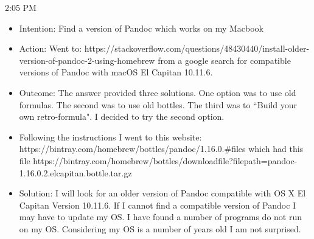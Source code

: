\documentclass{article}
\begin{document}
2:05 PM

\begin{itemize}
    \item Intention: Find a version of Pandoc which works on my Macbook
    \item Action: Went to: https://stackoverflow.com/questions/48430440/install-older-version-of-pandoc-2-using-homebrew from a google search for compatible versions of Pandoc with macOS El Capitan 10.11.6.
    \item Outcome: The answer provided three solutions. One option was to use old formulas. The second was to use old bottles. The third was to ``Build your own retro-formula". I decided to try the second option.
    \item Following the instructions I went to this website: https://bintray.com/homebrew/bottles/pandoc/1.16.0.\#files which had this file https://bintray.com/homebrew/bottles/download\textunderscore  file?file\textunderscore path=pandoc-1.16.0\-.2.el\textunderscore capitan.bottle.tar.gz
    \item Solution: I will look for an older version of Pandoc compatible with OS X El Capitan Version 10.11.6. If I cannot find a compatible version of Pandoc I may have to update my OS. I have found a number of programs do not run on my OS. Considering my OS is a number of years old I am not surprised.
\end{itemize}
\end{document}
